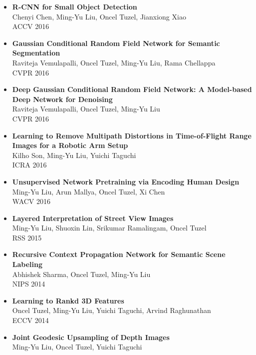 \documentclass[10pt,letterpaper]{article}
\begin{document}
\begin{itemize}
\item {\bf R-CNN for Small Object Detection}\\
      Chenyi Chen, Ming-Yu Liu, Oncel Tuzel, Jianxiong Xiao\\
      ACCV 2016\vspace{-2mm}      
\item {\bf Gaussian Conditional Random Field Network for Semantic Segmentation}\\
      Raviteja Vemulapalli, Oncel Tuzel, Ming-Yu Liu, Rama Chellappa\\
      CVPR 2016\vspace{-2mm}
\item {\bf Deep Gaussian Conditional Random Field Network: A Model-based Deep Network for Denoising}\\
      Raviteja Vemulapalli, Oncel Tuzel, Ming-Yu Liu\\ CVPR 2016\vspace{-2mm}
\item {\bf Learning to Remove Multipath Distortions in Time-of-Flight Range Images for a Robotic Arm Setup}\\
      Kilho Son, Ming-Yu Liu, Yuichi Taguchi\\
       ICRA 2016\vspace{-2mm}
\item {\bf Unsupervised Network Pretraining via Encoding Human Design}\\
      Ming-Yu Liu, Arun Mallya, Oncel Tuzel, Xi Chen\\ WACV 2016\vspace{-2mm}
\item {\bf Layered Interpretation of Street View Images}\\
      Ming-Yu Liu, Shuoxin Lin, Srikumar Ramalingam, Oncel Tuzel\\
      RSS 2015\vspace{-2mm}
\item {\bf Recursive Context Propagation Network for Semantic Scene Labeling}\\
			Abhishek Sharma, Oncel Tuzel, Ming-Yu Liu\\ NIPS 2014\vspace{-2mm}
\item {\bf Learning to Rankd 3D Features}\\
			Oncel Tuzel, Ming-Yu Liu, Yuichi Taguchi, Arvind Raghunathan\\ ECCV 2014\vspace{-2mm}
\item {\bf Joint Geodesic Upsampling of Depth Images}\\      Ming-Yu Liu, Oncel Tuzel, Yuichi Taguchi\\

\end{itemize}
\end{document}
